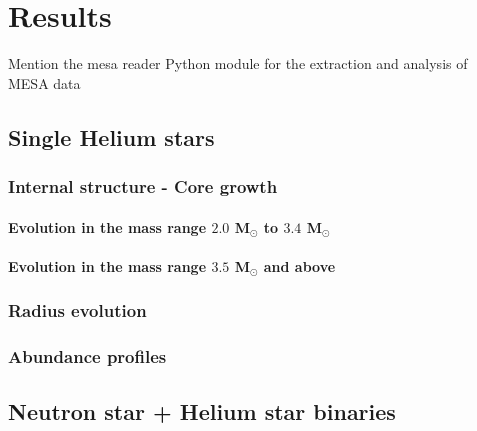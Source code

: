 \documentclass[../../main/thesis_msc.tex]{subfiles}
\begin{document}
	\chapter{Results}
	
		Mention the mesa reader Python module for the extraction and analysis of MESA data
		
			\section{Single Helium stars}
			
				\subsection{Internal structure - Core growth}
				
					\subsubsection{Evolution in the mass range $2.0$ M$_{\odot}$ to $3.4$ M$_{\odot}$}
					
					\subsubsection{Evolution in the mass range $3.5$ M$_{\odot}$ and above}
				
				
				\subsection{Radius evolution}
				
				
				\subsection{Abundance profiles}	
			
			
			
			\section{Neutron star + Helium star binaries}
\end{document}
